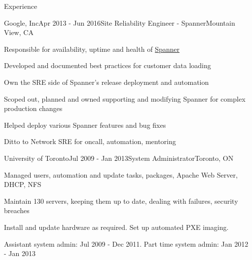 \documentclass{resume}
\begin{document}
\begin{rSection}{Experience}
    \begin{rSubsection}{Google, Inc}{Apr 2013 - Jun 2016}{Site Reliability Engineer - Spanner}{Mountain View, CA}
      \item Responsible for availability, uptime and health of \href{https://en.wikipedia.org/wiki/Spanner_(database)}{Spanner}
      \item Developed and documented best practices for customer data loading
      \item Own the SRE side of Spanner's release deployment and automation
      \item Scoped out, planned and owned supporting and modifying Spanner for complex production changes
      \item Helped deploy various Spanner features and bug fixes
      \item Ditto to Network SRE for oncall, automation, mentoring
    \end{rSubsection}

    \begin{rSubsection}{University of Toronto}{Jul 2009 - Jan 2013}{System Administrator}{Toronto, ON}
      \item Managed users, automation and update tasks, packages, Apache Web Server, DHCP, NFS
      \item Maintain 130 servers, keeping them up to date, dealing with failures, security breaches
      \item Install and update hardware as required.  Set up automated PXE imaging.
      \item Assistant system admin: Jul 2009 - Dec 2011. Part time system admin: Jan 2012 - Jan 2013
    \end{rSubsection}


\end{rSection}
\end{document}
